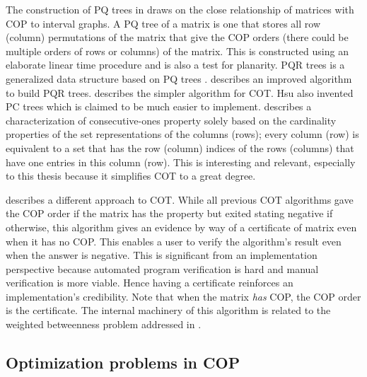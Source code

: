 {The construction of PQ trees in \cite{bl76} draws on the close
relationship of matrices with COP to interval graphs. A PQ tree of a
matrix is one that stores all row (column) permutations of the matrix
that give the COP orders (there could be multiple orders of rows or
columns) of the matrix. This is constructed using an elaborate linear
time procedure and is also a test for planarity.  PQR trees
is a generalized data structure based on PQ trees \cite{mm96,mpt98}.
\cite{tm05} describes an improved algorithm to build PQR
trees. \cite{wlh02} describes the
simpler algorithm for COT. Hsu also invented PC trees
\cite{wlh01}
which is claimed to be much easier to implement. \cite{nsnrs09}
describes a characterization of consecutive-ones property solely based
on the cardinality properties of the set representations of the
columns (rows); every column (row) is equivalent to a set that has the
row (column) indices of the rows (columns) that have one entries in
this column (row). This is interesting and relevant, especially to
this thesis because it simplifies COT to a great degree. 

\cite{mcc04} describes a different approach to COT. While all previous
COT algorithms gave the COP order if the matrix has the property but
exited stating negative if otherwise, this algorithm gives an evidence
by way of a certificate of matrix even when it has no COP. This
enables a user to verify the algorithm's result even when the answer
is negative. This is significant from an implementation perspective
because automated program verification is hard and manual verification
is more viable. Hence having a certificate reinforces an
implementation's credibility. Note that when the matrix {\em has} COP,
the COP order is the certificate.  The internal machinery of this
algorithm is related to the weighted betweenness problem
addressed in \cite{co98}.  


\subsection{Optimization problems in COP}
\label{sec:optcop}

}
